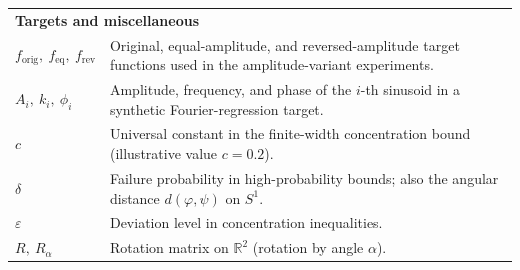 \begin{longtable}{p{} p{}}
\multicolumn{2}{l}{\textbf{Targets and miscellaneous}}\\[0.3em]
$f_{\mathrm{orig}},\ f_{\mathrm{eq}},\ f_{\mathrm{rev}}$ & Original, equal-amplitude, and reversed-amplitude target functions used in the amplitude-variant experiments. \\[0.4em]
$A_i,\ k_i,\ \phi_i$ & Amplitude, frequency, and phase of the $i$-th sinusoid in a synthetic Fourier-regression target. \\[0.4em]
$c$ & Universal constant in the finite-width concentration bound (illustrative value $c=0.2$). \\[0.4em]
$\delta$ & Failure probability in high-probability bounds; also the angular distance $d(\varphi,\psi)$ on $S^1$. \\[0.4em]
$\varepsilon$ & Deviation level in concentration inequalities. \\[0.4em]
$R,\ R_\alpha$ & Rotation matrix on $\mathbb{R}^2$ (rotation by angle $\alpha$). \\

\end{longtable}
